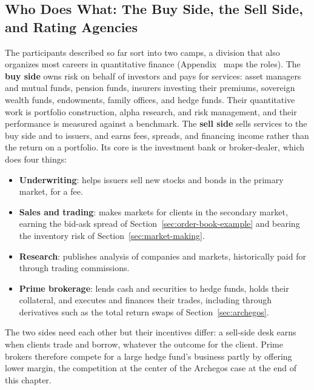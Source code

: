 \documentclass[../ai_in_finance]{subfiles}
\begin{document}
\subsection{Who Does What: The Buy Side, the Sell Side, and Rating Agencies}
\label{sec:buy-sell-side}

The participants described so far sort into two camps, a division that also organizes most careers in quantitative finance (Appendix~ maps the roles). The \textbf{buy side} owns risk on behalf of investors and pays for services: asset managers and mutual funds, pension funds, insurers investing their premiums, sovereign wealth funds, endowments, family offices, and hedge funds. Their quantitative work is portfolio construction, alpha research, and risk management, and their performance is measured against a benchmark. The \textbf{sell side} sells services to the buy side and to issuers, and earns fees, spreads, and financing income rather than the return on a portfolio. Its core is the investment bank or broker-dealer, which does four things:
\begin{itemize}
    \item \textbf{Underwriting}: helps issuers sell new stocks and bonds in the primary market, for a fee.
    \item \textbf{Sales and trading}: makes markets for clients in the secondary market, earning the bid-ask spread of Section~\ref{sec:order-book-example} and bearing the inventory risk of Section~\ref{sec:market-making}.
    \item \textbf{Research}: publishes analysis of companies and markets, historically paid for through trading commissions.
    \item \textbf{Prime brokerage}: lends cash and securities to hedge funds, holds their collateral, and executes and finances their trades, including through derivatives such as the total return swaps of Section~\ref{sec:archegos}.
\end{itemize}
The two sides need each other but their incentives differ: a sell-side desk earns when clients trade and borrow, whatever the outcome for the client. Prime brokers therefore compete for a large hedge fund's business partly by offering lower margin, the competition at the center of the Archegos case at the end of this chapter.
\end{document}
